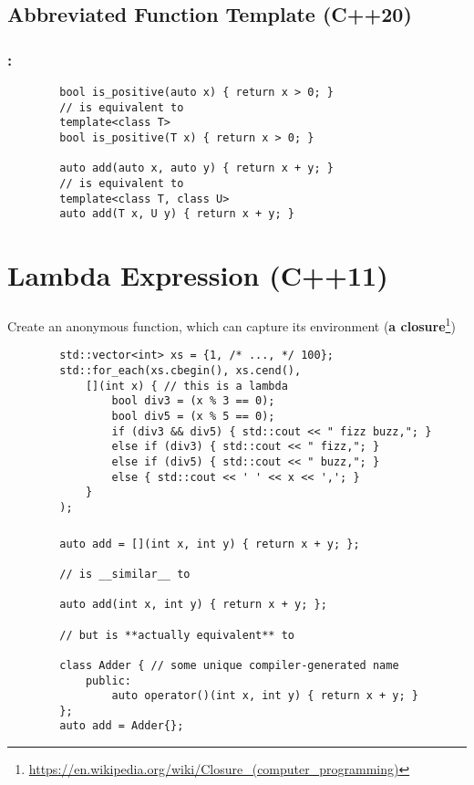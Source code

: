 \documentclass[aspectratio=43, t]{beamer}
\begin{document}
\subsection*{Abbreviated Function Template (C++20)}
\begin{frame}[fragile]
	\frametitle{\secname: \subsecname\footnotemark[1]{}}

	\begin{verbatim}
		bool is_positive(auto x) { return x > 0; }
		// is equivalent to
		template<class T>
		bool is_positive(T x) { return x > 0; }

		auto add(auto x, auto y) { return x + y; }
		// is equivalent to
		template<class T, class U>
		auto add(T x, U y) { return x + y; }
	\end{verbatim}
\end{frame}

\section*{Lambda Expression (C++11)}
\begin{frame}[fragile]
	\frametitle{\secname\footnotemark[1]{}}

	Create an anonymous function, which can capture its environment (\textbf{a closure}\footnote[2]{\url{https://en.wikipedia.org/wiki/Closure_(computer_programming)}})
	\begin{verbatim}
		std::vector<int> xs = {1, /* ..., */ 100};
		std::for_each(xs.cbegin(), xs.cend(),
			[](int x) { // this is a lambda
				bool div3 = (x % 3 == 0);
				bool div5 = (x % 5 == 0);
				if (div3 && div5) { std::cout << " fizz buzz,"; }
				else if (div3) { std::cout << " fizz,"; }
				else if (div5) { std::cout << " buzz,"; }
				else { std::cout << ' ' << x << ','; }
			}
		);
	\end{verbatim}
\end{frame}

\begin{frame}[fragile]
	\frametitle{\secname}

	\begin{verbatim}
		auto add = [](int x, int y) { return x + y; };

		// is __similar__ to

		auto add(int x, int y) { return x + y; };

		// but is **actually equivalent** to

		class Adder { // some unique compiler-generated name
			public:
				auto operator()(int x, int y) { return x + y; }
		};
		auto add = Adder{};
	\end{verbatim}
\end{frame}
\end{document}
